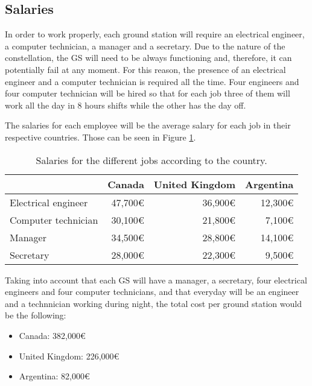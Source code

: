 \subsection{Salaries}
In order to work properly, each ground station will require an electrical engineer, a computer technician, a manager and a secretary. Due to the nature of the constellation, the GS will need to be always functioning and, therefore, it can potentially fail at any moment. For this reason, the presence of an electrical engineer and a computer technician is required all the time. Four engineers and four computer technician will be hired so that for each job three of them will work all the day in 8 hours shifts while the other has the day off.

The salaries for each employee will be the average salary for each job in their respective countries. Those can be seen in Figure \ref{table:Salaries}.
\begin{table}[H]
\begin{center}
\begin{tabular}{|l|r|r|r|}
\hline 
 & Canada & United Kingdom & Argentina \\ 
\hline 
Electrical engineer & 47,700\euro & 36,900\euro & 12,300\euro \\ 
\hline 
Computer technician & 30,100\euro & 21,800\euro & 7,100\euro \\ 
\hline 
Manager & 34,500\euro & 28,800\euro & 14,100\euro \\ 
\hline 
Secretary & 28,000\euro & 22,300\euro & 9,500\euro \\ 
\hline 
\end{tabular}
\end{center}
\caption[Salaries according to country]{Salaries for the different jobs according to the country.}
\label{table:Salaries}
\end{table}

Taking into account that each GS will have a manager, a secretary, four electrical engineers and four computer technicians, and that everyday will be an engineer and a technnician working during night, the total cost per ground station would be the following:
\begin{itemize}
\item Canada: 382,000\euro
\item United Kingdom: 226,000\euro
\item Argentina: 82,000\euro
\end{itemize}

